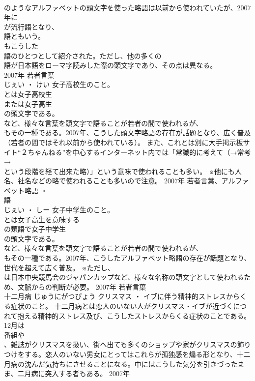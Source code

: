 \documentclass[8pt]{extreport}
\begin{document}
\begin{CJK}{UTF8}{min}
\\	のようなアルファベットの頭文字を使った略語は以前から使われていたが、2007年に
\\	が流行語となり、
\\	語ともいう。
\\	もこうした
\\	語のひとつとして紹介された。ただし、他の多くの
\\	語が日本語をローマ字読みした際の頭文字であり、その点は異なる。
\\	2007年	若者言葉	
\\	じぇい ・ けい	女子高校生のこと。	
\\	とは女子高校生
\\	または女子高生
\\	の頭文字である。
\\	など、様々な言葉を頭文字で語ることが若者の間で使われるが、
\\	もその一種である。2007年、こうした頭文字略語の存在が話題となり、広く普及（若者の間ではそれ以前から使われている）。 また、これとは別に大手掲示板サイト“２ちゃんねる”を中心するインターネット内では「常識的に考えて（→常考→
\\	という段階を経て出来た略）」という意味で使われることも多い。 ※他にも人名、社名などの略で使われることも多いので注意。	2007年	若者言葉、アルファベット略語 ・ 
\\	語	
\\	じぇい ・ しー	女子中学生のこと。	
\\	とは女子高生を意味する
\\	の類語で女子中学生
\\	の頭文字である。
\\	など、様々な言葉を頭文字で語ることが若者の間で使われるが、
\\	もその一種である。2007年、こうしたアルファベット略語の存在が話題となり、世代を超えて広く普及。 ※ただし、
\\	は日本中央競馬会のジャパンカップなど、様々な名称の頭文字として使われるため、文脈からの判断が必要。	2007年	若者言葉	
\\	十二月病	じゅうにがつびょう	クリスマス ・ イブに伴う精神的ストレスからくる症状のこと。	十二月病とは恋人のいない人がクリスマス・イブが近づくにつれて抱える精神的ストレス及び、こうしたストレスからくる症状のことである。12月は
\\	番組や
\\	、雑誌がクリスマスを扱い、街へ出ても多くのショップや家がクリスマスの飾りつけをする。恋人のいない男女にとってはこれらが孤独感を煽る形となり、十二月病の沈んだ気持ちにさせることになる。中にはこうした気分を引きづったまま、二月病に突入する者もある。	2007年	

\end{CJK}
\end{document}
